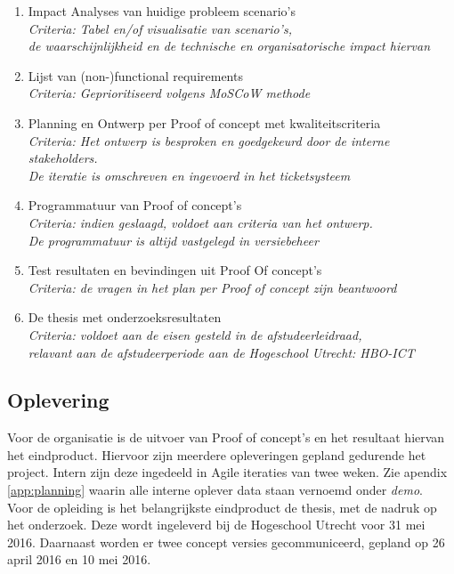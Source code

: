 \begin{enumerate}
\item Impact Analyses van huidige probleem scenario's \\
      \textit{Criteria: Tabel en/of visualisatie van scenario's, \\de waarschijnlijkheid en de technische en organisatorische impact hiervan }
\item Lijst van (non-)functional requirements \\
      \textit{Criteria: Geprioritiseerd volgens MoSCoW methode}
\item Planning en Ontwerp per Proof of concept met kwaliteitscriteria \\
      \textit{Criteria: Het ontwerp is besproken en goedgekeurd door de interne stakeholders.\\ De iteratie is omschreven en ingevoerd in het ticketsysteem}
\item Programmatuur van Proof of concept's \\
        \textit{Criteria: indien geslaagd, voldoet aan criteria van het ontwerp.\\ De programmatuur is altijd vastgelegd in versiebeheer}
\item Test resultaten en bevindingen uit Proof Of concept's \\
        \textit{Criteria: de vragen in het plan per Proof of concept zijn beantwoord}
\item De thesis met onderzoeksresultaten \\
    \textit{Criteria: voldoet aan de eisen gesteld in de afstudeerleidraad, \\
    relavant aan de afstudeerperiode aan de Hogeschool Utrecht: HBO-ICT}
\end{enumerate}

    \subsection{Oplevering}
    
    Voor de organisatie is de uitvoer van Proof of concept's en het resultaat hiervan het eindproduct. Hiervoor zijn meerdere opleveringen gepland gedurende het project. Intern zijn deze ingedeeld in Agile iteraties van twee weken. Zie apendix \ref{app:planning} waarin alle interne oplever data staan vernoemd onder \textit{demo}. \\
    
    Voor de opleiding is het belangrijkste eindproduct de thesis, met de nadruk op het onderzoek. Deze wordt ingeleverd bij de Hogeschool Utrecht voor 31 mei 2016. Daarnaast worden er twee concept versies gecommuniceerd, gepland op 26 april 2016 en 10 mei 2016.
    
